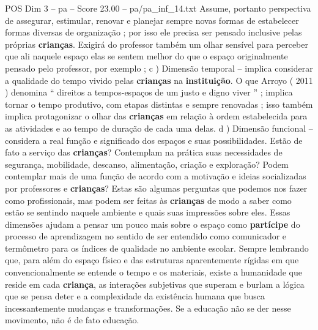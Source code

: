 \begin{textsample}{POS Dim 3 – pa – Score 23.00 – pa/pa\_inf\_14.txt}
Assume, portanto perspectiva de assegurar, estimular, renovar e planejar sempre novas formas de estabelecer formas diversas de organização ; por isso ele precisa ser pensado inclusive pelas próprias \textbf{crianças}.
Exigirá do professor também um olhar sensível para perceber que ali naquele espaço elas se sentem melhor do que o espaço originalmente pensado pelo professor, por exemplo ; c ) Dimensão temporal – implica considerar a qualidade do tempo vivido pelas \textbf{crianças} na \textbf{instituição}.
O que Arroyo ( 2011 ) denomina “ direitos a tempos-espaços de um justo e digno viver ” ; implica tornar o tempo produtivo, com etapas distintas e sempre renovadas ; isso também implica protagonizar o olhar das \textbf{crianças} em relação à ordem estabelecida para as atividades e ao tempo de duração de cada uma delas. d ) Dimensão funcional – considera a real função e significado dos espaços e suas possibilidades.
Estão de fato a serviço das \textbf{crianças}?
Contemplam na prática suas necessidades de segurança, mobilidade, descanso, alimentação, criação e exploração?
Podem contemplar mais de uma função de acordo com a motivação e ideias socializadas por professores e \textbf{crianças}?
Estas são algumas perguntas que podemos nos fazer como profissionais, mas podem ser feitas às \textbf{crianças} de modo a saber como estão se sentindo naquele ambiente e quais suas impressões sobre eles.
Essas dimensões ajudam a pensar um pouco mais sobre o espaço como \textbf{partícipe} do processo de aprendizagem no sentido de ser entendido como comunicador e termômetro para os índices de qualidade no ambiente escolar.
Sempre lembrando que, para além do espaço físico e das estruturas aparentemente rígidas em que convencionalmente se entende o tempo e os materiais, existe a humanidade que reside em cada \textbf{criança}, as interações subjetivas que superam e burlam a lógica que se pensa deter e a complexidade da existência humana que busca incessantemente mudanças e transformações.
Se a educação não se der nesse movimento, não é de fato educação.

\end{textsample}

